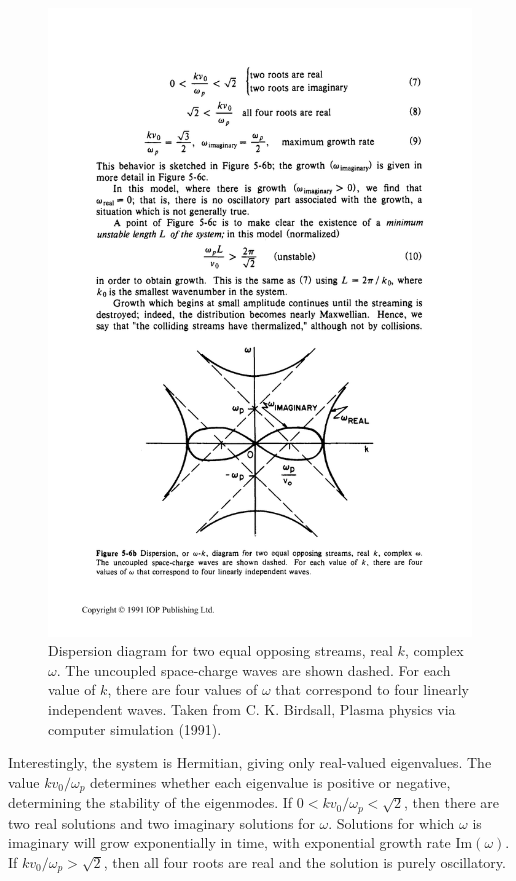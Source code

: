 \documentclass[%
 reprint,
 amsmath,amssymb,
 aps,
]{revtex4-2}
\begin{document}
\begin{figure}
\includegraphics[width=0.9\linewidth]{proj3/birdsall-dispersion-wk.pdf}
\caption{\label{fig:two-stream-dispersion}Dispersion diagram for two equal opposing streams, real $k$, complex $\omega$. The uncoupled space-charge waves are shown dashed. For each value of $k$, there are four values of $\omega$ that correspond to four linearly independent waves. Taken from C. K.  Birdsall, Plasma physics via computer simulation (1991).}
\end{figure}

Interestingly, the system is Hermitian, giving only real-valued eigenvalues. The value $k v_0 / \omega_p$ determines whether each eigenvalue is positive or negative, determining the stability of the eigenmodes. If $0 < k v_0 / \omega_p < \sqrt{2}$, then there are two real solutions and two imaginary solutions for $\omega$. Solutions for which $\omega$ is imaginary will grow exponentially in time, with exponential growth rate $\text{Im}(\omega)$. If $k v_0 / \omega_p > \sqrt{2}$, then all four roots are real and the solution is purely oscillatory.
\end{document}

